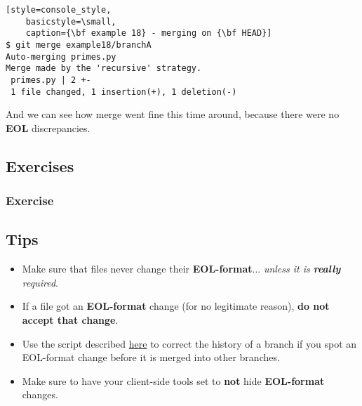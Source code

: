 \begin{lstlisting}[style=console_style,
	basicstyle=\small,
	caption={\bf example 18} - merging on {\bf HEAD}]
$ git merge example18/branchA
Auto-merging primes.py
Merge made by the 'recursive' strategy.
 primes.py | 2 +-
 1 file changed, 1 insertion(+), 1 deletion(-)
\end{lstlisting}

And we can see how merge went fine this time around, because there were no {\bf EOL} discrepancies.

\subsection{Exercises}

\subsubsection{Exercise }


\subsection{Tips}
\begin{itemize}
	\item Make sure that files never change their {\bf EOL-format}... {\it unless it is {\bf really} required}.
	\item If a file got an {\bf EOL-format} change (for no legitimate reason), {\bf do not accept that change}.
	\item Use the script described \hyperref[correct_eol_history]{here} to correct the history of a branch if you
	spot an EOL-format change before it is merged into other branches.
	\item Make sure to have your client-side tools set to {\bf not} hide {\bf EOL-format} changes.
\end{itemize}
